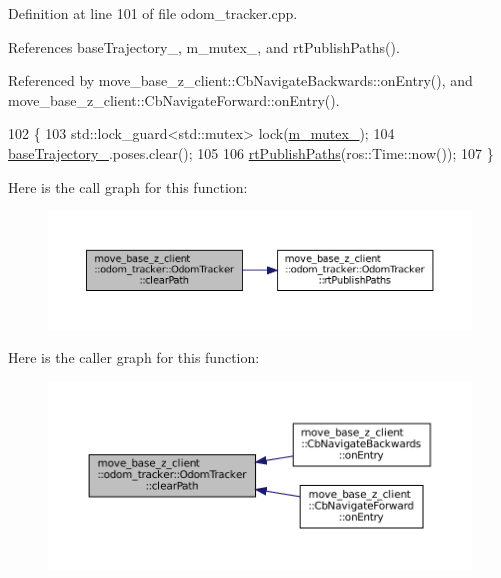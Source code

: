 Definition at line 101 of file odom\+\_\+tracker.\+cpp.



References base\+Trajectory\+\_\+, m\+\_\+mutex\+\_\+, and rt\+Publish\+Paths().



Referenced by move\+\_\+base\+\_\+z\+\_\+client\+::\+Cb\+Navigate\+Backwards\+::on\+Entry(), and move\+\_\+base\+\_\+z\+\_\+client\+::\+Cb\+Navigate\+Forward\+::on\+Entry().


\begin{DoxyCode}
102 \{
103     std::lock\_guard<std::mutex> lock(\hyperlink{classmove__base__z__client_1_1odom__tracker_1_1OdomTracker_a63676e03be48b18ac48d5e2f11f19a25}{m\_mutex\_});
104     \hyperlink{classmove__base__z__client_1_1odom__tracker_1_1OdomTracker_a83fa5a9bfe0b2683eee33444d3f030ea}{baseTrajectory\_}.poses.clear();
105 
106     \hyperlink{classmove__base__z__client_1_1odom__tracker_1_1OdomTracker_a6ee06474c7aea4423a7937c8ebc193ad}{rtPublishPaths}(ros::Time::now());
107 \}
\end{DoxyCode}
Here is the call graph for this function\+:
\nopagebreak
\begin{figure}[H]
\begin{center}
\leavevmode
\includegraphics[width=350pt]{classmove__base__z__client_1_1odom__tracker_1_1OdomTracker_ae131b8bd2c3587b12cdc9b22699e8837_cgraph}
\end{center}
\end{figure}
Here is the caller graph for this function\+:
\nopagebreak
\begin{figure}[H]
\begin{center}
\leavevmode
\includegraphics[width=350pt]{classmove__base__z__client_1_1odom__tracker_1_1OdomTracker_ae131b8bd2c3587b12cdc9b22699e8837_icgraph}
\end{center}
\end{figure}

